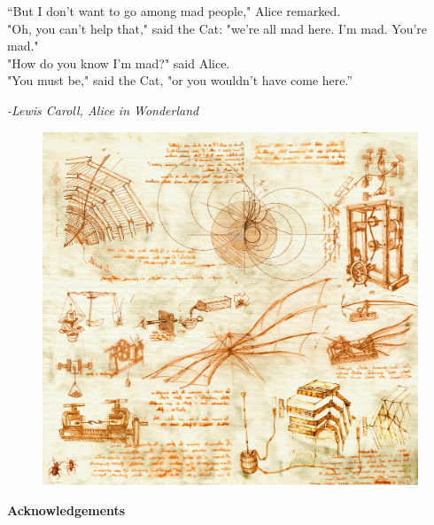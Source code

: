 \cleardoublepage\thispagestyle{empty}

     

\begin{center}
	\epigraph{“But I don’t want to go among mad people," Alice remarked.\\
	"Oh, you can’t help that," said the Cat: "we’re all mad here. I’m mad. You’re mad."\\
	"How do you know I’m mad?" said Alice.\\
	"You must be," said the Cat, "or you wouldn’t have come here.” }{\textit{-Lewis Caroll, Alice in Wonderland}}
	
	\vspace*{10mm}
	
	
	
	
	\begin{figure}[th]
		\centering
		\includegraphics[width=.85\linewidth]{./cover/oreach-2009-001_16}
	\end{figure}
	\vspace{10mm}
	\huge \textbf{Acknowledgements}
	
	\vspace{10mm}
	
	
	
\end{center}

	





\cleardoublepage
\setlength{\topmargin}{0mm}
\normalsize%